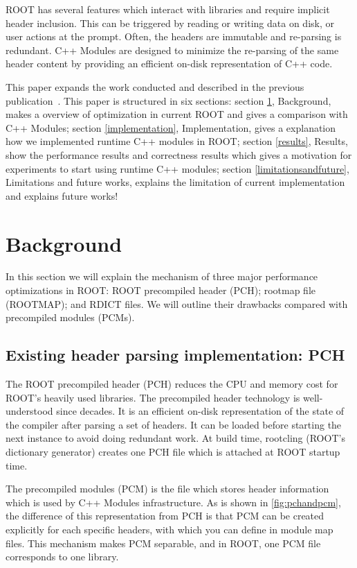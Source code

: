 \documentclass{webofc}
\begin{document}
ROOT has several features which interact with libraries and require implicit header inclusion. This can be triggered by reading or writing data on disk, or user actions at the prompt. Often, the headers are immutable and re-parsing is redundant. C++ Modules are designed to minimize the re-parsing of the same header content by providing an efficient on-disk representation of C++ code.

This paper expands the work conducted and described in the previous publication~\cite{vassil-paper}. This paper is structured in six sections: section \ref{background}, Background, makes a overview of optimization in current ROOT and gives a comparison with C++ Modules; section \ref{implementation}, Implementation, gives a explanation how we implemented runtime C++ modules in ROOT; section \ref{results}, Results, show the performance results and correctness results which gives a motivation for experiments to start using runtime C++ modules; section \ref{limitationsandfuture}, Limitations and future works, explains the limitation of current implementation and explains future works!

\section{Background}
\label{background}

In this section we will explain the mechanism of three major performance optimizations in ROOT: ROOT precompiled header (PCH); rootmap file (ROOTMAP); and RDICT files. We will outline their drawbacks compared with precompiled modules (PCMs).

\subsection{Existing header parsing implementation: PCH}
\label{pch}

The ROOT precompiled header (PCH) reduces the CPU and memory cost for ROOT’s heavily used libraries. The precompiled header technology is well-understood since decades. It is an efficient on-disk representation of the state of the compiler after parsing a set of headers. It can be loaded before starting the next instance to avoid doing redundant work. At build time, rootcling (ROOT’s dictionary generator) creates one PCH file which is attached at ROOT startup time.

The precompiled modules (PCM) is the file which stores header information which is used by C++ Modules infrastructure. As is shown in \ref{fig:pchandpcm}, the difference of this representation from PCH is that PCM can be created explicitly for each specific headers, with which you can define in module map files. This mechanism makes PCM separable, and in ROOT, one PCM file corresponds to one library.
\end{document}
